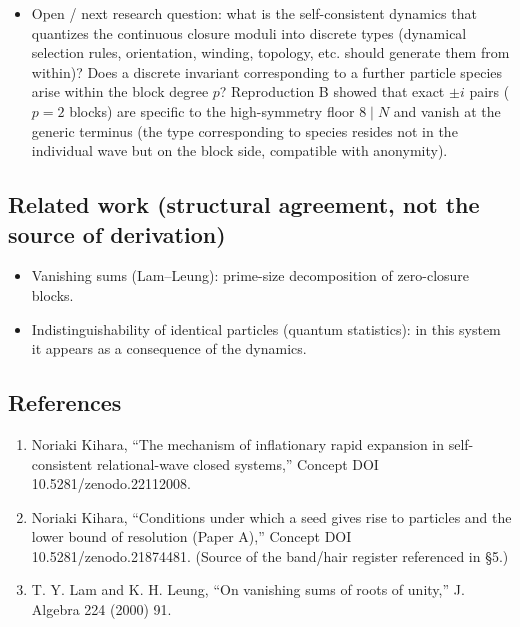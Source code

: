 \documentclass[
  a4paper,
]{ltjsarticle}
\providecommand{\tightlist}{%
  \setlength{\itemsep}{0pt}\setlength{\parskip}{0pt}}
\begin{document}
\begin{itemize}
  orbit under \(S_2\), and \(k\ge3\) is a continuous moduli
  (\(\dim_{\mathbb C}=k-2\ge1\), not removed by the finite group
  \(S_k\)). What is discrete is not \(\pm\) but the \textbf{block degree
  \(p=\operatorname{spf}(N/\gcd(N,4))\)} (Paper 4), where the closure
  axiom + the discrete symmetry of the floor quantizes the block size.
\item
  Open / next research question: what is the self-consistent dynamics
  that quantizes the continuous closure moduli into discrete types
  (dynamical selection rules, orientation, winding, topology, etc.
  should generate them from within)? Does a discrete invariant
  corresponding to a further particle species arise within the block
  degree \(p\)? Reproduction B showed that exact \(\pm i\) pairs
  (\(p=2\) blocks) are specific to the high-symmetry floor \(8\mid N\)
  and vanish at the generic terminus (the type corresponding to species
  resides not in the individual wave but on the block side, compatible
  with anonymity).
\end{itemize}

\subsection{Related work (structural agreement, not the source of
derivation)}\label{related-work-structural-agreement-not-the-source-of-derivation}

\begin{itemize}
\tightlist
\item
  Vanishing sums (Lam--Leung): prime-size decomposition of zero-closure
  blocks.
\item
  Indistinguishability of identical particles (quantum statistics): in
  this system it appears as a consequence of the dynamics.
\end{itemize}

\subsection{References}\label{references}

\begin{enumerate}
\def\labelenumi{\arabic{enumi}.}
\tightlist
\item
  Noriaki Kihara, ``The mechanism of inflationary rapid expansion in
  self-consistent relational-wave closed systems,'' Concept DOI
  10.5281/zenodo.22112008.
\item
  Noriaki Kihara, ``Conditions under which a seed gives rise to
  particles and the lower bound of resolution (Paper A),'' Concept DOI
  10.5281/zenodo.21874481. (Source of the band/hair register referenced
  in §5.)
\item
  T. Y. Lam and K. H. Leung, ``On vanishing sums of roots of unity,'' J.
  Algebra 224 (2000) 91.
\end{enumerate}
\end{document}
